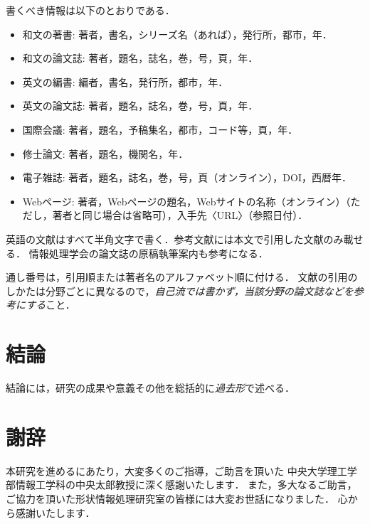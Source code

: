 \documentclass[a4j,12pt]{jreport}
\def\syaji{ \chapter*{謝辞} \addcontentsline{toc}{chapter}{謝辞}}
\begin{document}
書くべき情報は以下のとおりである．
\begin{itemize}
\item 和文の著書: 著者，書名，シリーズ名（あれば），発行所，都市，年．
\item 和文の論文誌: 著者，題名，誌名，巻，号，頁，年．
\item 英文の編書: 編者，書名，発行所，都市，年．
\item 英文の論文誌: 著者，題名，誌名，巻，号，頁，年．
\item 国際会議: 著者，題名，予稿集名，都市，コード等，頁，年．
\item 修士論文: 著者，題名，機関名，年．
\item 電子雑誌: 著者，題名，誌名，巻，号，頁（オンライン），DOI，西暦年．
\item Webページ: 著者，Webページの題名，Webサイトの名称（オンライン）（ただし，著者と同じ場合は省略可），入手先〈URL〉（参照日付）．
\end{itemize}
英語の文献はすべて半角文字で書く．参考文献には本文で引用した文献のみ載せる．
情報処理学会の論文誌の原稿執筆案内\cite{IPSJ}も参考になる．

通し番号は，引用順または著者名のアルファベット順に付ける．
文献の引用のしかたは分野ごとに異なるので，{\em 自己流では書かず，当該分野の論文誌などを参考にする}こと．



\chapter{結論} \label{chapter:6}

結論には，研究の成果や意義その他を総括的に{\em 過去形}で述べる．



\syaji
\par
本研究を進めるにあたり，大変多くのご指導，ご助言を頂いた
中央大学理工学部情報工学科の中央太郎教授に深く感謝いたします．
また，多大なるご助言，ご協力を頂いた形状情報処理研究室の皆様には大変お世話になりました．
心から感謝いたします．
\end{document}
